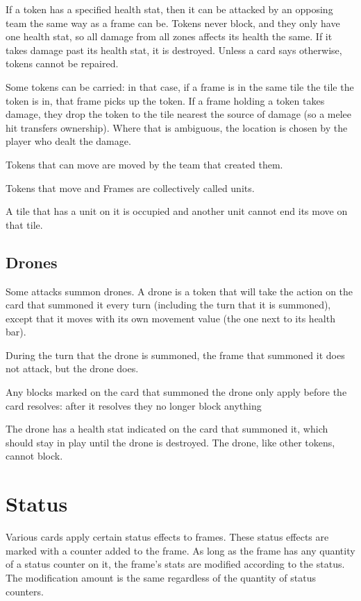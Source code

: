 \documentclass[a4paper, twocolumn]{article}
\begin{document}
If a token has a specified health stat, then it can be attacked by an opposing team the same way as a frame can be.
Tokens never block, and they only have one health stat, so all damage from all zones affects its health the same.
If it takes damage past its health stat, it is destroyed. Unless a card says otherwise, tokens cannot be repaired.

Some tokens can be carried: in that case, if a frame is in the same tile the tile the token is in, that frame picks up the token.
If a frame holding a token takes damage, they drop the token to the tile nearest the source of damage (so a melee hit transfers ownership).
Where that is ambiguous, the location is chosen by the player who dealt the damage.

Tokens that can move are moved by the team that created them.

Tokens that move and Frames are collectively called units.

A tile that has a unit on it is occupied and another unit cannot end its move on that tile.

\subsection{Drones}
Some attacks summon drones. A drone is a token that will take the action on the card that summoned it every turn
(including the turn that it is summoned), except that it moves with its own movement value (the one next to its health bar).

During the turn that the drone is summoned, the frame that summoned it does not attack, but the drone does. 

Any blocks marked on the card that summoned the drone only apply before the card resolves: after it resolves they no longer block anything

The drone has a health stat indicated on the card that summoned it, which should stay in play until the drone is destroyed.
The drone, like other tokens, cannot block.



\section{Status}
Various cards apply certain status effects to frames. These status effects are marked with a counter added to the frame.
As long as the frame has any quantity of a status counter on it, the frame's stats are modified according to the status.
The modification amount is the same regardless of the quantity of status counters.
\end{document}
